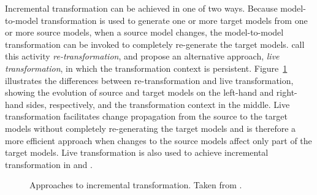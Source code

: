 Incremental transformation can be achieved in one of two ways. Because model-to-model transformation is used to generate one or more target models from one or more source models, when a source model changes, the model-to-model transformation can be invoked to completely re-generate the target models. \cite{hearnden06incremental} call this activity \emph{re-transformation}, and propose an alternative approach, \emph{live transformation}, in which the transformation context is persistent. Figure~\ref{fig:incremental_transformation_types} illustrates the differences between re-transformation and live transformation, showing the evolution of source and target models on the left-hand and right-hand sides, respectively, and the transformation context in the middle. Live transformation facilitates change propagation from the source to the target models without completely re-generating the target models and is therefore a more efficient approach when changes to the source models affect only part of the target models. Live transformation is also used to achieve incremental transformation in \cite{rath08live} and \cite{tratt08change}.

\begin{figure}[htbp]
	\centering
	\caption[Approaches to incremental transformation]{Approaches to incremental transformation. Taken from \cite{hearnden06incremental}.}
\label{fig:incremental_transformation_types}
\end{figure}


